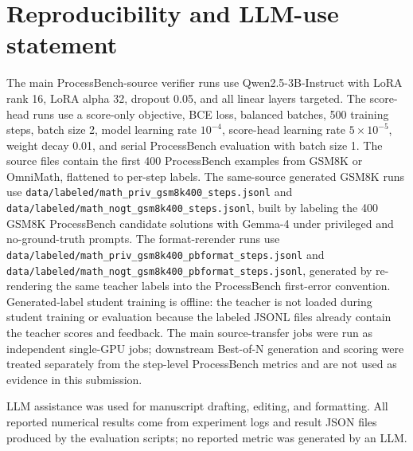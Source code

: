 \documentclass{article}
\begin{document}
\section{Reproducibility and LLM-use statement}

The main ProcessBench-source verifier runs use Qwen2.5-3B-Instruct with LoRA rank 16, LoRA alpha 32, dropout 0.05, and all linear layers targeted.
The score-head runs use a score-only objective, BCE loss, balanced batches, 500 training steps, batch size 2, model learning rate $10^{-4}$, score-head learning rate $5\times 10^{-5}$, weight decay 0.01, and serial ProcessBench evaluation with batch size 1.
The source files contain the first 400 ProcessBench examples from GSM8K or OmniMath, flattened to per-step labels.
The same-source generated GSM8K runs use \texttt{data/labeled/math\_priv\_gsm8k400\_steps.jsonl} and \texttt{data/labeled/math\_nogt\_gsm8k400\_steps.jsonl}, built by labeling the 400 GSM8K ProcessBench candidate solutions with Gemma-4 under privileged and no-ground-truth prompts.
The format-rerender runs use \texttt{data/labeled/math\_priv\_gsm8k400\_pbformat\_steps.jsonl} and \texttt{data/labeled/math\_nogt\_gsm8k400\_pbformat\_steps.jsonl}, generated by re-rendering the same teacher labels into the ProcessBench first-error convention.
Generated-label student training is offline: the teacher is not loaded during student training or evaluation because the labeled JSONL files already contain the teacher scores and feedback.
The main source-transfer jobs were run as independent single-GPU jobs; downstream Best-of-N generation and scoring were treated separately from the step-level ProcessBench metrics and are not used as evidence in this submission.

LLM assistance was used for manuscript drafting, editing, and formatting.
All reported numerical results come from experiment logs and result JSON files produced by the evaluation scripts; no reported metric was generated by an LLM.
\end{document}
